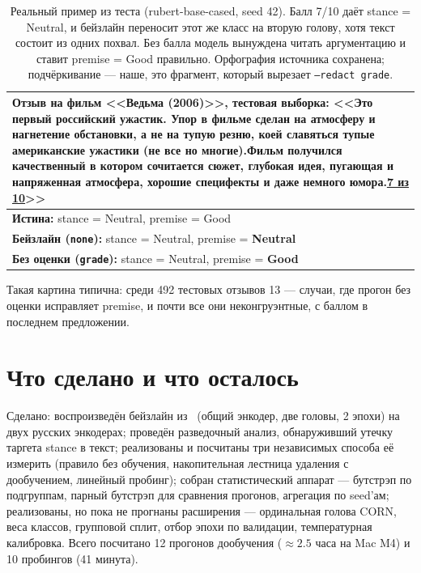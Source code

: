 \documentclass{article}
\begin{document}
\begin{table}[!tbh]
    \centering
    \begin{tabular}{|p{12cm}|}
\hline
\textbf{Отзыв на фильм <<Ведьма (2006)>>, тестовая выборка:}\newline
<<Это первый российский ужастик. Упор в фильме сделан на атмосферу и нагнетение
обстановки, а не на тупую резню, коей славяться тупые американские ужастики
(не все но многие).Фильм получился качественный в котором сочитается сюжет,
глубокая идея, пугающая и напряженная атмосфера, хорошие специфекты и даже
немного юмора.\underline{7 из 10}>> \\
\hline
\textbf{Истина:} stance = Neutral, premise = Good \\
\textbf{Бейзлайн (\texttt{none}):} stance = Neutral, premise = \textbf{Neutral} \\
\textbf{Без оценки (\texttt{grade}):} stance = Neutral, premise = \textbf{Good} \\
\hline
    \end{tabular}
    \caption{Реальный пример из теста (rubert-base-cased, seed 42). Балл 7/10 даёт
    stance = Neutral, и бейзлайн переносит этот же класс на вторую голову, хотя текст
    состоит из одних похвал. Без балла модель вынуждена читать аргументацию и ставит
    premise = Good правильно. Орфография источника сохранена; подчёркивание --- наше,
    это фрагмент, который вырезает \texttt{--redact grade}.}
    \label{tab:output}
\end{table}

Такая картина типична: среди 492 тестовых отзывов 13 --- случаи, где прогон без оценки
исправляет premise, и почти все они неконгруэнтные, с баллом в последнем предложении.

\section{Что сделано и что осталось}

Сделано: воспроизведён бейзлайн из~\cite{serbina2026argument} (общий энкодер, две головы,
2 эпохи) на двух русских энкодерах; проведён разведочный анализ, обнаруживший утечку
таргета stance в текст; реализованы и посчитаны три независимых способа её измерить
(правило без обучения, накопительная лестница удаления с дообучением, линейный пробинг);
собран статистический аппарат --- бутстрэп по подгруппам, парный бутстрэп для сравнения
прогонов, агрегация по seed'ам; реализованы, но пока не прогнаны расширения --- ординальная
голова CORN, веса классов, групповой сплит, отбор эпохи по валидации, температурная
калибровка. Всего посчитано 12 прогонов дообучения ($\approx 2.5$ часа на Mac M4)
и 10 пробингов (41 минута).
\end{document}
